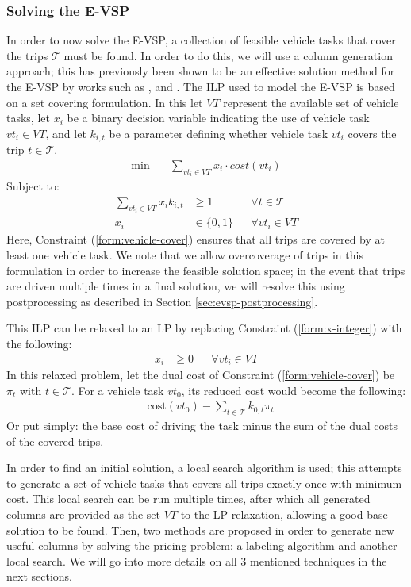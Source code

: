 \documentclass[]{article}
\begin{document}
\subsubsection{Solving the E-VSP}
In order to now solve the E-VSP, a collection of feasible vehicle tasks that cover the trips $\mathcal{T}$ must be found. In order to do this, we will use a column generation approach; this has previously been shown to be an effective solution method for the E-VSP by works such as \citet{vanKootenNiekerk2017}, \citet{Zhang2021} and \citet{deVos2024}. The ILP used to model the E-VSP is based on a set covering formulation. In this let $VT$ represent the available set of vehicle tasks, let $x_{i}$ be a binary decision variable indicating the use of vehicle task $vt_i \in VT$, and let $k_{i,t}$ be a parameter defining whether vehicle task $vt_i$ covers the trip $t \in \mathcal{T}$.
\begin{align}
\min \quad
& \sum_{vt_i \in VT} x_{i} \cdot cost(vt_i)
\end{align}
Subject to:
\begin{align}
\sum_{vt_i \in VT} x_{i}k_{i,t} &\geq 1 && \forall t \in \mathcal{T} \label{form:vehicle-cover}\\
x_{i} &\in \{ 0, 1 \} && \forall vt_i \in VT \label{form:x-integer}
\end{align}
Here, Constraint (\ref{form:vehicle-cover}) ensures that all trips are covered by at least one vehicle task. We note that we allow overcoverage of trips in this formulation in order to increase the feasible solution space; in the event that trips are driven multiple times in a final solution, we will resolve this using postprocessing as described in Section \ref{sec:evsp-postprocessing}.

This ILP can be relaxed to an LP by replacing Constraint (\ref{form:x-integer}) with the following:
\begin{align}
x_{i} &\geq 0 && \forall vt_i \in VT
\end{align}
In this relaxed problem, let the dual cost of Constraint (\ref{form:vehicle-cover}) be $\pi_t$ with $t \in \mathcal{T}$. For a vehicle task $vt_0$, its reduced cost would become the following:
\begin{align}
& \text{cost}(vt_0) - \sum_{t \in \mathcal{T}} k_{0,t} \pi_{t} 
\end{align}
Or put simply: the base cost of driving the task minus the sum of the dual costs of the covered trips.

In order to find an initial solution, a local search algorithm is used; this attempts to generate a set of vehicle tasks that covers all trips exactly once with minimum cost. This local search can be run multiple times, after which all generated columns are provided as the set $VT$ to the LP relaxation, allowing a good base solution to be found. Then, two methods are proposed in order to generate new useful columns by solving the pricing problem: a labeling algorithm and another local search. We will go into more details on all 3 mentioned techniques in the next sections. 
\end{document}
